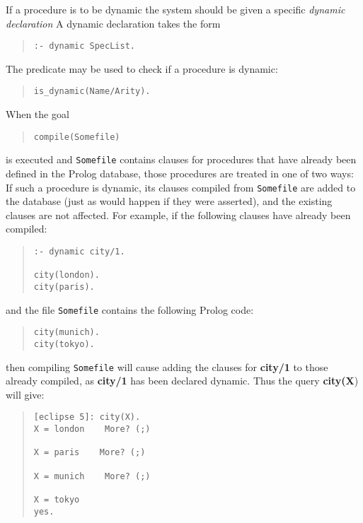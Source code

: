 If a procedure is to be dynamic the {\eclipse} system should be
given a specific {\it dynamic declaration}
A dynamic declaration takes the form
\begin{quote} \begin{verbatim}
:- dynamic SpecList.
\end{verbatim} \end{quote}
The predicate  may be used to check if a procedure
is dynamic:
\begin{quote} \begin{verbatim}
is_dynamic(Name/Arity).
\end{verbatim} \end{quote}
When the goal 
\begin{quote} \begin{verbatim}
compile(Somefile)
\end{verbatim} \end{quote}
is executed
and {\tt Somefile} contains clauses for procedures that have
already been defined
in the Prolog database, those procedures are treated in one of two ways:
If such a procedure is dynamic, its clauses compiled from {\tt Somefile}
are added to the database (just as would happen if they were asserted),
and the existing clauses are not affected.
For example, if the following
clauses have already been compiled:
\begin{quote}
\begin{verbatim}
:- dynamic city/1.

city(london).
city(paris).
\end{verbatim}
\end{quote}
and the file {\tt Somefile} contains the
following Prolog code:
\begin{quote}
\begin{verbatim}
city(munich).
city(tokyo).
\end{verbatim}
\end{quote}
then compiling {\tt Somefile} will cause adding
the clauses for {\bf city/1} to those
already compiled, as {\bf city/1} has been declared dynamic.
Thus the query  {\bf city(X}) will give:
\begin{quote}
\begin{verbatim}
[eclipse 5]: city(X).
X = london    More? (;)

X = paris    More? (;)

X = munich    More? (;)

X = tokyo
yes.
\end{verbatim}
\end{quote}

